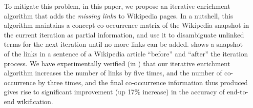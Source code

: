 %

To mitigate this problem, in this paper, we propose an iterative enrichment
algorithm that adds the {\em missing links} to Wikipedia pages. In a nutshell, this
algorithm maintains a concept co-occurrence matrix of the Wikipedia
snapshot in the current iteration as partial information, and
use it to disambiguate unlinked terms for the next iteration until
no more links can be added.
 shows a snapshot of the links in a sentence of a
Wikipedia article ``before'' and ``after'' the iteration process.
We have experimentally verified (in ) that
our iterative enrichment algorithm increases the number of links by five times,
and the number of co-occurrence by three times,
and the final co-occurrence information thus produced
gives rise to significant improvement (up 17\% increase)
in the accuracy of end-to-end wikification.

